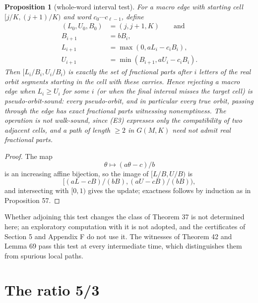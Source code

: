 \documentclass[11pt,reqno]{amsart}
\newtheorem{proposition}[theorem]{Proposition}
\theoremstyle{definition}
\theoremstyle{remark}
\begin{document}
\begin{samepage}
\begin{proposition}[whole-word interval test]\leavevmode\label{thm:73}
For a macro edge with
starting cell \([j/K,(j+1)/K)\) and word \(c_0\cdots c_{\ell-1}\),
define
\[
\begin{aligned}
(L_0,U_0,B_0)&=(j,j+1,K)\qquad\text{and}\\
B_{i+1}&=bB_i,\\
L_{i+1}&=\max(0,aL_i-c_iB_i),\\
U_{i+1}&=\min(B_{i+1},aU_i-c_iB_i).
\end{aligned}
\]
Then \([L_i/B_i,U_i/B_i)\) is
exactly the set of fractional parts after \(i\) letters of the real
orbit segments starting in the cell with these carries. Hence rejecting
a macro edge when \(L_i\ge U_i\) for some \(i\) (or when the final
interval misses the target cell) is pseudo-orbit-sound: every
pseudo-orbit, and in particular every true orbit, passing through the
edge has exact fractional parts witnessing nonemptiness. The operation
is not walk-sound, since (E3) expresses only the compatibility of two
adjacent cells, and a path of length \(\ge2\) in \(G(M,K)\) need not
admit real fractional parts.
\label{thm-end:73}
\end{proposition}
\end{samepage}

\begin{proof}\leavevmode\label{proof:73}
The map
\[
\theta\mapsto(a\theta-c)/b
\]
is an increasing
affine bijection, so the image of \([L/B,U/B)\) is
\[
[(aL-cB)/(bB),(aU-cB)/(bB)),
\]
and intersecting with \([0,1)\) gives
the update; exactness follows by induction as in Proposition 57. \qedhere
\end{proof}

Whether adjoining this test changes the class of Theorem 37 is not
determined here; an exploratory computation with it is not adopted,
and the certificates of Section 5 and Appendix F do not use it. The witnesses of
Theorem 42 and Lemma 69 pass this test at every intermediate time,
which distinguishes them from spurious local paths.

\section{The ratio 5/3}\label{app:F}
\end{document}
